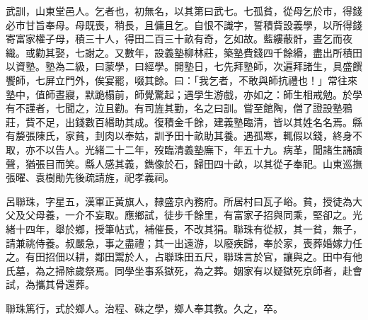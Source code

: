 \begin{pinyinscope}
武訓，山東堂邑人。乞者也，初無名，以其第曰武七。七孤貧，從母乞於市，得錢必市甘旨奉母。母既喪，稍長，且傭且乞。自恨不識字，誓積貲設義學，以所得錢寄富家權子母，積三十人，得田二百三十畝有奇，乞如故。藍縷蔽骭，晝乞而夜織。或勸其娶，七謝之。又數年，設義塾柳林莊，築塾費錢四千餘緡，盡出所積田以資塾。塾為二級，曰蒙學，曰經學。開塾日，七先拜塾師，次遍拜諸生，具盛饌饗師，七屏立門外，俟宴罷，啜其餘。曰：「我乞者，不敢與師抗禮也！」常往來塾中，值師晝寢，默跪榻前，師覺驚起；遇學生游戲，亦如之：師生相戒勉。於學有不謹者，七聞之，泣且勸。有司旌其勤，名之曰訓。嘗至館陶，僧了證設塾鴉莊，貲不足，出錢數百緡助其成。復積金千餘，建義塾臨清，皆以其姓名名焉。縣有嫠張陳氏，家貧，刲肉以奉姑，訓予田十畝助其養。遇孤寒，輒假以錢，終身不取，亦不以告人。光緒二十二年，歿臨清義塾廡下，年五十九。病革，聞諸生誦讀聲，猶張目而笑。縣人感其義，鐫像於石，歸田四十畝，以其從子奉祀。山東巡撫張曜、袁樹勛先後疏請旌，祀孝義祠。

呂聯珠，字星五，漢軍正黃旗人，隸盛京內務府。所居村曰瓦子峪。貧，授徒為大父及父母養，一介不妄取。應鄉試，徒步千餘里，有富家子招與同乘，堅卻之。光緒十四年，舉於鄉，授筆帖式，補催長，不改其狷。聯珠有從叔，其一貧，無子，請兼祧侍養。叔嚴急，事之盡禮；其一出遠游，以廢疾歸，奉於家，喪葬婚嫁力任之。有田招佃以耕，鄰田鬻於人，占聯珠田五尺，聯珠言於官，讓與之。田中有他氏墓，為之掃除歲祭焉。同學坐事系獄死，為之葬。姻家有以疑獄死京師者，赴會試，為攜其骨還葬。

聯珠篤行，式於鄉人。治程、硃之學，鄉人奉其教。久之，卒。


\end{pinyinscope}